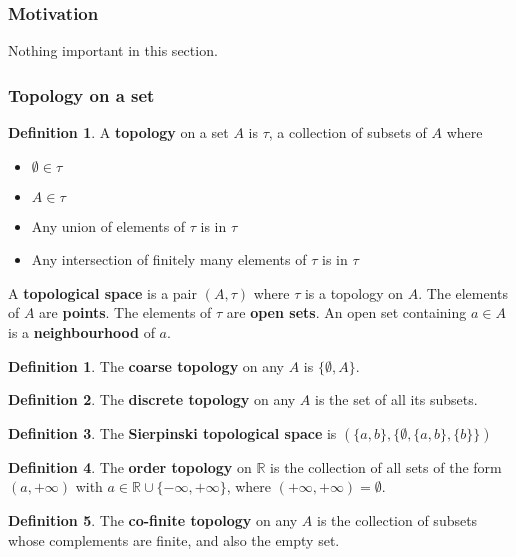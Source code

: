 \documentclass[12pt]{article}
\theoremstyle{definition}
\newtheorem{defn}{Definition}[section]
\newtheorem*{defn*}{Definition}
\begin{document}
\subsubsection{Motivation}

Nothing important in this section.

\subsubsection{Topology on a set}

\begin{defn}
	A \textbf{topology} on a set $A$ is $\tau$, a collection of subsets of $A$ where
	\begin{itemize}
		\item $\emptyset \in \tau$
		\item $A \in \tau$
		\item Any union of elements of $\tau$ is in $\tau$
		\item Any intersection of finitely many elements of $\tau$ is in $\tau$
	\end{itemize}
	A \textbf{topological space} is a pair $(A, \tau)$ where $\tau$ is a topology on $A$.
	The elements of $A$ are \textbf{points}.
	The elements of $\tau$ are \textbf{open sets}.
	An open set containing $a \in A$ is a \textbf{neighbourhood} of $a$.
\end{defn}

\begin{defn*}
	The \textbf{coarse topology} on any $A$ is $\{\emptyset, A\}$.
\end{defn*}

\begin{defn*}
	The \textbf{discrete topology} on any $A$ is the set of all its subsets.
\end{defn*}

\begin{defn*}
	The \textbf{Sierpinski topological space} is $(\{a, b\}, \{\emptyset, \{a, b\}, \{b\}\})$
\end{defn*}

\begin{defn*}
	The \textbf{order topology} on $\mathbb{R}$ is the collection of all sets of the form $(a, +\infty)$ with $a \in \mathbb{R} \cup \{-\infty, +\infty\}$, where $(+\infty, +\infty) = \emptyset$.
\end{defn*}

\begin{defn*}
	The \textbf{co-finite topology} on any $A$ is the collection of subsets whose complements are finite, and also the empty set.
\end{defn*}
\end{document}
